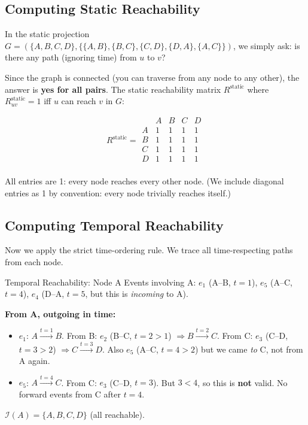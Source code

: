 \subsection{Computing Static Reachability}

In the static projection $G = (\{A,B,C,D\}, \{\{A,B\},\{B,C\},\{C,D\},\{D,A\},\{A,C\}\})$,
we simply ask: is there any path (ignoring time) from $u$ to $v$?

Since the graph is connected (you can traverse from any node to any other), the answer is
\textbf{yes for all pairs}. The static reachability matrix $R^{\text{static}}$ where
$R^{\text{static}}_{uv} = 1$ iff $u$ can reach $v$ in $G$:

\[
R^{\text{static}} =
\begin{array}{c|cccc}
  & A & B & C & D \\
\hline
A & 1 & 1 & 1 & 1 \\
B & 1 & 1 & 1 & 1 \\
C & 1 & 1 & 1 & 1 \\
D & 1 & 1 & 1 & 1 \\
\end{array}
\]

All entries are 1: every node reaches every other node. (We include diagonal entries as 1
by convention: every node trivially reaches itself.)

\subsection{Computing Temporal Reachability}

Now we apply the strict time-ordering rule. We trace all time-respecting paths from each node.

\begin{examplebox}{Temporal Reachability: Node A}
Events involving A: $e_1$ (A--B, $t=1$), $e_5$ (A--C, $t=4$), $e_4$ (D--A, $t=5$, but this
is \textit{incoming} to A).

\textbf{From A, outgoing in time:}
\begin{itemize}[noitemsep]
  \item $e_1$: $A \xrightarrow{t=1} B$. From B: $e_2$ (B--C, $t=2>1$) $\Rightarrow B \xrightarrow{t=2} C$. From C: $e_3$ (C--D, $t=3>2$) $\Rightarrow C \xrightarrow{t=3} D$. Also $e_5$ (A--C, $t=4>2$) but we came \textit{to} C, not from A again.
  \item $e_5$: $A \xrightarrow{t=4} C$. From C: $e_3$ (C--D, $t=3$). But $3 < 4$, so this is \textbf{not} valid. No forward events from C after $t=4$.
\end{itemize}
$\mathcal{I}(A) = \{A, B, C, D\}$ (all reachable).
\end{examplebox}

